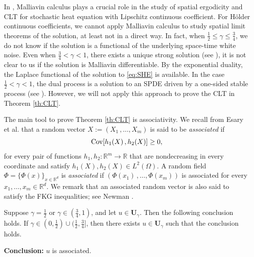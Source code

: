\documentclass[12pt, reqno]{amsart}
\newcommand{\R}{{\mathbb{R}}}
\newcommand{\<}{\langle}
\renewcommand{\>}{\rangle}
\DeclareMathOperator{\Cov}{\text{\rm Cov}}
\begin{document}
In \cite{HNV20, CKNP21}, Malliavin calculus plays a crucial role in the 
study of spatial ergodicity and CLT for stochastic heat equation with 
Lipschitz continuous coefficient. For H\"older continuous coefficients, we 
cannot apply Malliavin calculus to study spatial limit theorems of the 
solution, at least not in a direct way.  In fact, when 
$\frac12\leq \gamma\leq \frac34$, we do not know if the solution is a 
functional of the underlying space-time white noise. Even when 
$\frac34<\gamma<1$, there exists a unique strong solution (see 
\cite[Theorem 1.3]{MP11}), it is not clear to us if the solution is 
Malliavin differentiable.  By the exponential duality, the Laplace 
functional of the solution to \eqref{eq:SHE} is available. In the case 
$\frac12<\gamma<1$, the dual process is a solution to an SPDE driven by a 
one-sided stable process (see \cite{Myt98}). However, we will not apply 
this approach to prove the CLT in Theorem \ref{th:CLT}. 

The main tool to prove Theorem \ref{th:CLT} is associativity.  We recall from Esary et al. \cite{EPW67} that
a random vector $X:=(X_1\,,\ldots,X_m)$ is said to be \emph{associated} if
	\begin{equation}\label{E:assoc}
		\Cov[h_1(X)\,,h_2(X)]\ge0,
	\end{equation}
for every pair of functions $h_1,h_2:\R^m\to\R$ that are nondecreasing in 
every coordinate and satisfy $h_1(X),h_2(X)\in L^2(\Omega)$. A random 
field $\Phi=\{\Phi(x)\}_{x\in\R^d}$ is \emph{associated} if 
$(\Phi(x_1)\,,\ldots,\Phi(x_m))$ is associated for every 
$x_1,\ldots,x_m\in\R^d$. We remark that an associated random vector is 
also said to satisfy the FKG inequalities; see Newman \cite{New80}.

\begin{theorem}\label{th:association}
          Suppose $\gamma=\frac{1}{2}$ or $\gamma\in(\frac{3}{4},1)$, and 
let $u\in\mathbf{U}_\gamma$.  Then the following conclusion holds.  If 
$\gamma\in (0, \frac12)\cup(\frac{1}{2},\frac{3}{4}]$, then there exists 
$u\in\mathbf{U}_\gamma$ such that the conclusion holds.  

       \textbf{Conclusion:}  $u$ is associated. 
\end{theorem}
\end{document}
